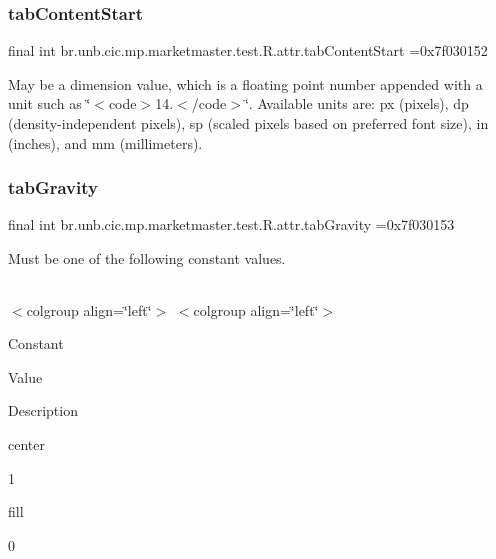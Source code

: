 \subsubsection{\texorpdfstring{tab\+Content\+Start}{tabContentStart}}
{\footnotesize\ttfamily final int br.\+unb.\+cic.\+mp.\+marketmaster.\+test.\+R.\+attr.\+tab\+Content\+Start =0x7f030152\hspace{0.3cm}{\ttfamily [static]}}

May be a dimension value, which is a floating point number appended with a unit such as \char`\"{}$<$code$>$14.\+5sp$<$/code$>$\char`\"{}. Available units are\+: px (pixels), dp (density-\/independent pixels), sp (scaled pixels based on preferred font size), in (inches), and mm (millimeters). \mbox{\label{classbr_1_1unb_1_1cic_1_1mp_1_1marketmaster_1_1test_1_1R_1_1attr_a58a4316f57b1df7e70f9642cc1acc752}} 
\subsubsection{\texorpdfstring{tab\+Gravity}{tabGravity}}
{\footnotesize\ttfamily final int br.\+unb.\+cic.\+mp.\+marketmaster.\+test.\+R.\+attr.\+tab\+Gravity =0x7f030153\hspace{0.3cm}{\ttfamily [static]}}

Must be one of the following constant values.

\tabulinesep=1mm
\begin{longtabu} spread 0pt [c]{*{0}{|X[-1]}|}
\hline
\end{longtabu}
$<$colgroup align=\char`\"{}left\char`\"{}$>$ $<$colgroup align=\char`\"{}left\char`\"{}$>$ 

Constant

Value

Description 

center

1

fill

0\mbox{\label{classbr_1_1unb_1_1cic_1_1mp_1_1marketmaster_1_1test_1_1R_1_1attr_a490b9772cc6b09618c6ababd0f756695}} 
